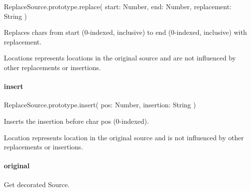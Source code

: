 \begin{DoxyCode}
ReplaceSource.prototype.replace(
    start: Number,
    end: Number,
    replacement: String
)
\end{DoxyCode}


Replaces chars from {\ttfamily start} (0-\/indexed, inclusive) to {\ttfamily end} (0-\/indexed, inclusive) with {\ttfamily replacement}.

Locations represents locations in the original source and are not influenced by other replacements or insertions.

\paragraph*{{\ttfamily insert}}


\begin{DoxyCode}
ReplaceSource.prototype.insert(
    pos: Number,
    insertion: String
)
\end{DoxyCode}


Inserts the {\ttfamily insertion} before char {\ttfamily pos} (0-\/indexed).

Location represents location in the original source and is not influenced by other replacements or insertions.

\paragraph*{{\ttfamily original}}

Get decorated {\ttfamily Source}. 